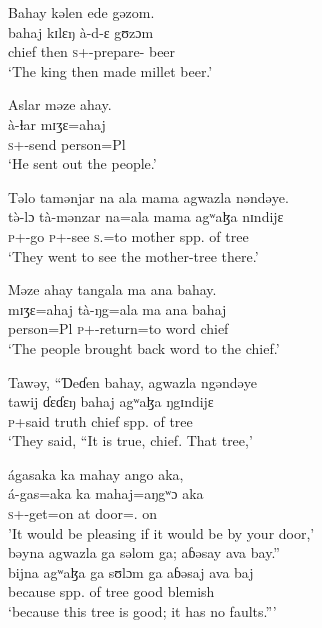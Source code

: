 \ea Bahay  kəlen  ede  gəzom.  \\
 \gll bahaj  kɪlɛŋ  à-d-ɛ                 gʊzɔm\\
  chief  then  \textsc{s}+{\PFV}-prepare{}-{\CL}  beer\\
  \glt ‘The king then made millet beer.’
  \z

\ea   Aslar  məze  ahay.  \\
 \gll à-ɬar    mɪʒɛ=ahaj\\
  \textsc{s}+{\PFV}-send    person=Pl\\
 \glt ‘He sent out the people.’
 \z

\ea   Təlo  tamənjar  na  ala  mama  agwazla  nəndəye.\\ 
\gll t\`ə-lɔ             tà-mənzar            na=ala  mama   agʷaɮa     nɪndijɛ\\
  \textsc{p}+{\PFV}-go  \textsc{p}+{\HOR}-see  \textsc{s}.{\DO}=to     mother  {spp. of tree}  {\DEM}\\
  \glt ‘They went to see the mother-tree there.’
  \z

\ea   Məze  ahay  tangala  ma  ana  bahay.\\
 \gll mɪʒɛ=ahaj   tà-ŋg=ala  ma      ana  bahaj\\
  person=Pl    \textsc{p}+{\PFV}-return=to   word  {\DAT}  chief\\
  \glt ‘The people brought back word to the chief.’
  \z

\ea   Tawəy,  “Ɗeɗen  bahay,  agwazla  ngəndəye \\
  \gll tawij     ɗɛɗɛŋ   bahaj    agʷaɮa  ŋgɪndijɛ \\  
  \textsc{p}+said  truth     chief     {spp. of tree}    {\DEM}  \\
  \glt ‘They said, “It is true, chief. That tree,'
  
  \medskip  
 ágasaka  ka  mahay  ango  aka, \\
\gll   á-gas=aka   ka    mahaj=aŋgʷɔ aka\\
  \textsc{s}+{\IFV}-get=on    at   door={\twoS}.{\POSS} on\\
  \glt 'It would be pleasing if it would be by your door,’\\
  
  \medskip
 bəyna  agwazla  ga  səlom  ga;  aɓəsay  ava  bay.”\\
 \gll bijna      agʷaɮa  ga    sʊlɔm ga  aɓəsaj  ava     baj\\ 
 because   {spp. of tree}  {\ADJ}   good   {\ADJ}   blemish   {\EXT}  {\NEG}\\
  \glt ‘because this tree is good;  it has no faults.”’
  \z
  
